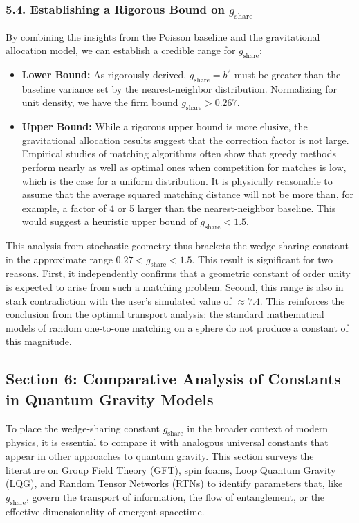 \documentclass[11pt]{article}
\begin{document}
\subsubsection*{5.4. Establishing a Rigorous Bound on $g_{\mathrm{share}}$}
By combining the insights from the Poisson baseline and the gravitational allocation model, we can establish a credible range for $g_{\mathrm{share}}$:

\begin{itemize}
  \item \textbf{Lower Bound:} As rigorously derived, $g_{\mathrm{share}} = b^2$ must be greater than the baseline variance set by the nearest-neighbor distribution. Normalizing for unit density, we have the firm bound $g_{\mathrm{share}} > 0.267$.
  \item \textbf{Upper Bound:} While a rigorous upper bound is more elusive, the gravitational allocation results suggest that the correction factor is not large. Empirical studies of matching algorithms often show that greedy methods perform nearly as well as optimal ones when competition for matches is low, which is the case for a uniform distribution. It is physically reasonable to assume that the average squared matching distance will not be more than, for example, a factor of 4 or 5 larger than the nearest-neighbor baseline. This would suggest a heuristic upper bound of $g_{\mathrm{share}} < 1.5$.
\end{itemize}

This analysis from stochastic geometry thus brackets the wedge-sharing constant in the approximate range $0.27 < g_{\mathrm{share}} < 1.5$. This result is significant for two reasons. First, it independently confirms that a geometric constant of order unity is expected to arise from such a matching problem. Second, this range is also in stark contradiction with the user’s simulated value of $\approx 7.4$. This reinforces the conclusion from the optimal transport analysis: the standard mathematical models of random one-to-one matching on a sphere do not produce a constant of this magnitude.

\subsection*{Section 6: Comparative Analysis of Constants in Quantum Gravity Models}
To place the wedge-sharing constant $g_{\mathrm{share}}$ in the broader context of modern physics, it is essential to compare it with analogous universal constants that appear in other approaches to quantum gravity. This section surveys the literature on Group Field Theory (GFT), spin foams, Loop Quantum Gravity (LQG), and Random Tensor Networks (RTNs) to identify parameters that, like $g_{\mathrm{share}}$, govern the transport of information, the flow of entanglement, or the effective dimensionality of emergent spacetime.
\end{document}
